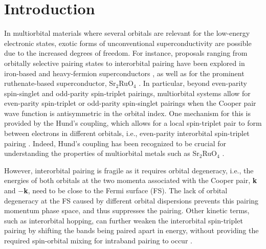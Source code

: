 \documentclass[%
reprint,
superscriptaddress,
 amsmath,amssymb,
 aps,
prb,
nobalancelastpage,
]{revtex4-2}
\begin{document}
\maketitle





\section{\label{intro}Introduction}

In multiorbital materials where several orbitals are relevant for the low-energy electronic states, exotic forms of unconventional superconductivity are possible due to the increased degrees of freedom. For instance, proposals ranging from orbitally selective pairing states to interorbital pairing have been explored in iron-based and heavy-fermion superconductors \cite{KarbowskiPRB1994,MasudaBookJPS,ZhouPRB2008,Ongpnas2016,GaoPRB2010,nica2017nature,nica2021multiorbital}, as well as for the prominent ruthenate-based superconductor, Sr$_{2}$RuO$_{4}$ \cite{Maeno1994Nature,Mackenzie2003RMP,Kallin2012rpp,Mackenzie2017NPJ, SpalekPRB2001,Puetter2012EPL, Hoshino2015PRL, Hoshino2016PRB,Gingras2019PRL, Suh2019, clepkens2021, kaser2021}. In particular, beyond even-parity spin-singlet and odd-parity spin-triplet pairings, multiorbital systems allow for even-parity spin-triplet or odd-parity spin-singlet pairings when the Cooper pair wave function is antisymmetric in the orbital index. One mechanism for this is provided by the Hund's coupling, which allows for a local spin-triplet pair to form between electrons in different orbitals, i.e., even-parity interorbital spin-triplet pairing \cite{klejnberg1999hund, SpalekPRB2001, HanPRB2004, Dai2008PRL,Puetter2012EPL,Hoshino2015PRL,Hoshino2016PRB, Gingras2019PRL,vafek2017hund}. Indeed, Hund's coupling has been recognized to be crucial for understanding the properties of multiorbital metals such as Sr$_{2}$RuO$_{4}$ \cite{CuocoPRB1998,mravlje2011PRL,LucaPRL2011,Georges2013ARCMP, Strand2019PRB,Tamai2019PRX}.


However, interorbital pairing is fragile as it requires orbital degeneracy, i.e., the energies of both orbitals at the two momenta associated with the Cooper pair, \textbf{k} and $-$\textbf{k}, need to be close to the Fermi surface (FS). The lack of orbital degeneracy at the FS caused by different orbital dispersions prevents this pairing momentum phase space, and thus suppresses the pairing. Other kinetic terms, such as interorbital hopping, can further weaken the interorbital spin-triplet pairing by shifting the bands being paired apart in energy, without providing the required spin-orbital mixing for intraband pairing to occur \cite{Ramires2016PRB,Ramires2018PRB,Cheung2019PRB,clepkens2021}.
\end{document}
